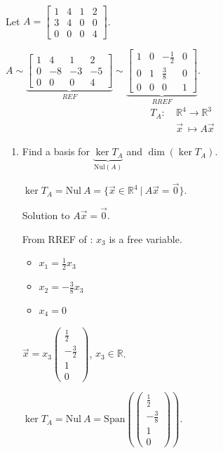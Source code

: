 \documentclass[11pt,fleqn]{book} %
\begin{document}
\begin{example}
{~~~}

    Let $A = \begin{bmatrix} 1&4&1&2 \\ 3&4&0&0 \\ 0&0&0&4 \end{bmatrix}$. 
    
    $A \sim \underbrace{ \begin{bmatrix} 1&4&1&2\\0&-8&-3&-5\\0&0&0&4 \end{bmatrix} }_{REF} \sim \underbrace{ \begin{bmatrix} 1&0&-\frac{1}{2}&0\\0&1&\frac{3}{8}&0\\0&0&0&1 \end{bmatrix}}_{RREF}$. 
    \begin{align*}
        T_A:
        &~\mathbb{R}^4 \to \mathbb{R}^3
        \\
        &~\vec{x} ~\mapsto A\vec{x}
    \end{align*}
    
    \begin{enumerate}
        \item Find a basis for $\underbrace{\ker T_A}_{\mathrm{Nul}(A)}$ and $\dim\left( \ker T_A \right)$. 
        
        $\ker T_A = \mathrm{Nul}~A = \{ \vec{x} \in \mathbb{R}^4 ~|~ A\vec{x} = \vec{0} \}$. 
        
        Solution to $A\vec{x} = \vec{0}$.
        
        From RREF of : $x_3$ is a free variable. 
        \begin{itemize}
            \item ${x_1} = \frac{1}{2}{x_3}$
            \item ${x_2} = -\frac{3}{8}{x_3}$
            \item $x_4 = 0$
        \end{itemize}
        
        $\vec{x} = {x_3} \begin{pmatrix} \frac{1}{2} \\ -\frac{3}{2} \\ 1 \\ 0 \end{pmatrix}$, $x_3 \in \mathbb{R}$. 
        
        $\ker T_A = \mathrm{Nul}~A = \mathrm{Span}\left( \begin{pmatrix} \frac12 \\ -\frac38 \\ 1 \\ 0 \end{pmatrix} \right)$. 
        

\end{enumerate}
\end{example}
\end{document}
